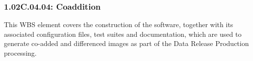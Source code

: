 \subsubsection{1.02C.04.04: Coaddition}

This WBS element covers the construction of the software,
together with its associated configuration files, test suites and
documentation, which are used to generate co-added and differenced
images as part of the Data Release Production processing.
